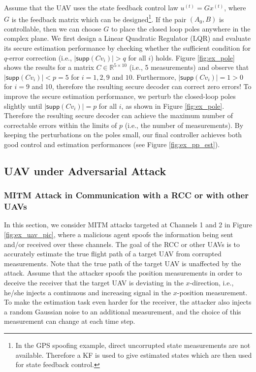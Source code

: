 \documentclass[journal]{IEEEtran}
\begin{document}
Assume that the UAV uses the state feedback control law $u^{(t)} = G x^{(t)}$, where $G$ is the feedback matrix which can be designed\footnote{In the GPS spoofing example, direct uncorrupted state measurements are not available. Therefore a KF is used to give estimated states which are then used for state feedback control.}. If the pair $(A_0, B)$ is controllable, then we can choose $G$ to place the closed loop poles anywhere in the complex plane. We first design a Linear Quadratic Regulator (LQR) and evaluate its secure estimation performance by checking whether the sufficient condition for $q$-error correction  (i.e., $\lvert \textsf{supp} (C v_i) \rvert > q$ for all $i$) holds. 
Figure \ref{fig:ex_pole} shows the results for a matrix $C \in \mathbb{R}^{5\times 10}$ (i.e., 5 measurements) and observe that $\lvert \textsf{supp} (C v_i) \rvert < p = 5$ for $i=1,2,9$ and $10$. Furthermore, $\lvert \textsf{supp} (C v_i) \rvert = 1 > 0$ for $i = 9$ and $10$, therefore the resulting secure decoder can correct zero errors!
To improve the secure estimation performance, we perturb the closed-loop poles slightly until $\lvert \textsf{supp} (C v_i) \rvert = p$ for all $i$, as shown in Figure \ref{fig:ex_pole}. Therefore the resulting secure decoder can achieve the maximum number of correctable errors within the limits of $p$ (i.e., the number of measurements). By keeping the perturbations on the poles small, our final controller achieves both good control and estimation performances (see Figure \ref{fig:ex_pp_est}).




\subsection{UAV under Adversarial Attack}

\subsubsection{MITM Attack in Communication with a RCC or with other UAVs} \label{sec:uav_utm}
In this section, we consider MITM attacks targeted at Channels 1 and 2 in Figure \ref{fig:ex_uav_pic}, where a malicious agent spoofs the information being sent and/or received over these channels. The goal of the RCC or other UAVs is to accurately estimate the true flight path of a target UAV from corrupted measurements. 
Note that the true path of the target UAV is unaffected by the attack.
Assume that the attacker spoofs the position measurements in order to deceive the receiver that the target UAV is deviating in the $x$-direction, i.e., he/she injects a continuous and increasing signal in the $x$-position measurement.
To make the estimation task even harder for the receiver, the attacker also injects a random Gaussian noise to an additional measurement, and the choice of this measurement can change at each time step. 
\end{document}
